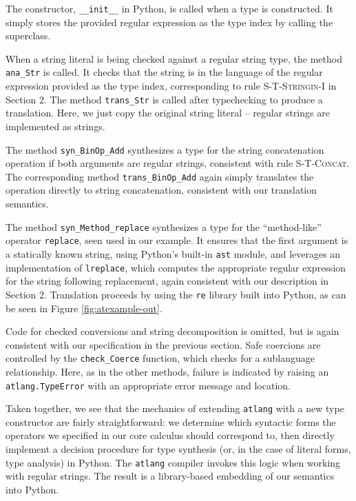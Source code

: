 \documentclass[9pt]{sig-alternate}
\theoremstyle{definition}
\begin{document}
The constructor, \verb|__init__| in Python, is called when a type is constructed. It simply stores the provided regular expression as the type index by calling the superclass.

When a string literal is being checked against a regular string type, the method \verb|ana_Str| is called. It checks that the string is in the language of the regular expression provided as the type index, corresponding to rule \textsc{S-T-Stringin-I} in Section 2. The method \verb|trans_Str| is called after typechecking to produce a translation. Here, we just copy the original string literal -- regular strings are implemented as strings.

The method \verb|syn_BinOp_Add| synthesizes a type for the string concatenation operation if both arguments are regular strings, consistent with rule \textsc{S-T-Concat}. The corresponding method \verb|trans_BinOp_Add| again simply translates the operation directly to string concatenation, consistent with our translation semantics.

The method \verb|syn_Method_replace| synthesizes a type for the ``method-like'' operator \verb|replace|, seen used in our example. It ensures that the first argument is a statically known string, using Python's built-in \verb|ast| module, and leverages an implementation of \verb|lreplace|, which computes the appropriate regular expression for the string following replacement, again consistent with our description in Section 2. Translation proceeds by using the \verb|re| library built into Python, as can be seen in Figure \ref{fig:atexample-out}. 

Code for checked conversions and string decomposition is omitted, but is again consistent with our specification in the previous section. Safe coercions are controlled by the \verb|check_Coerce| function, which checks for a sublanguage relationship. Here, as in the other methods, failure is indicated by raising an \verb|atlang.TypeError| with an appropriate error message and location.

Taken together, we see that the mechanics of extending \verb|atlang| with a new type constructor are fairly straightforward: we determine which syntactic forms the operators we specified in our core calculus should correspond to, then directly implement a decision procedure for type synthesis (or, in the case of literal forms, type analysis) in Python. The \verb|atlang| compiler invokes this logic when working with regular strings. The result is a library-based embedding of our semantics into Python. 
\end{document}
